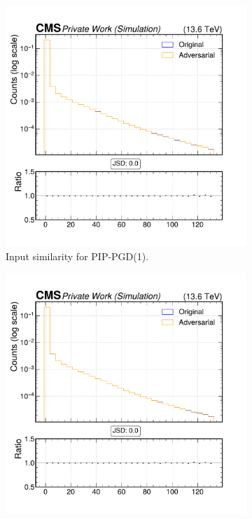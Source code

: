 \begin{figure}[h]
  \centering
  \begin{subfigure}[t]{0.32\textwidth}
    \includegraphics[width=\linewidth]{media/output/features/compare/combined_it_1/cmp_cpf_arr_Cpfcan_BtagPf_trackSip2dSig.pdf}
    \caption*{Input similarity for PIP-PGD(1).}
  \end{subfigure}\hfill
  \begin{subfigure}[t]{0.32\textwidth}
    \includegraphics[width=\linewidth]{media/output/features/compare/combined_it_2/cmp_cpf_arr_Cpfcan_BtagPf_trackSip2dSig.pdf}

\end{subfigure}
\end{figure}
